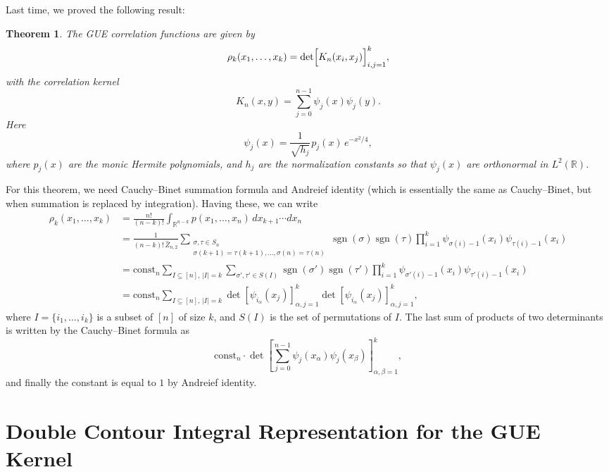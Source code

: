 \documentclass[letterpaper,11pt,oneside,reqno]{book}
\numberwithin{equation}{chapter}  %
\newcommand{\ssp}{\hspace{1pt}}
\newtheorem{theorem}[proposition]{Theorem}
\theoremstyle{definition}
\begin{document}
Last time, we proved the following result:
\begin{theorem}
\label{lecture6:thm:determinantal_GUE}
The GUE correlation functions are given by
\[
\rho_k(x_1,\dots,x_k)=\det\Bigl[K_n(x_i,x_j)\Bigr]_{i,j=1}^k,
\]
with the correlation kernel
\[
K_n(x,y)=\sum_{j=0}^{n-1}\psi_j(x)\psi_j(y).
\]
Here
\begin{equation*}
	\psi_j(x)=\frac{1}{\sqrt{h_j}}\ssp p_j(x)\,e^{-x^2/4},
\end{equation*}
where \(p_j(x)\) are the monic Hermite polynomials, and \(h_j\) are the normalization constants so that
$\psi_j(x)$ are orthonormal in $L^2(\mathbb{R})$.
\end{theorem}

For this theorem, we need Cauchy--Binet summation formula
and Andreief identity (which is essentially the same as Cauchy--Binet, but when summation is
replaced by integration). Having these, we can write
\begin{align*}
	\rho_k(x_1,\dots,x_k)&=\frac{n!}{(n-k)!}\int_{\mathbb{R}^{n-k}} p(x_1,\dots,x_n) \,dx_{k+1}\cdots dx_n
	\\
	&=
	\frac{1}{(n-k)!\,\widehat{Z}_{n,2}}
	\sum_{\substack{\sigma,\tau\in S_n\\
	\sigma(k+1)=\tau(k+1),\ldots,\sigma(n)=\tau(n) }} \operatorname{sgn}(\sigma)\operatorname{sgn}(\tau)
	\prod_{i=1}^k \psi_{\sigma(i)-1}(x_i)\psi_{\tau(i)-1}(x_i)
	\\
	&=
	\mathrm{const}_n\sum_{I\subseteq [n],\,|I|=k}
	\sum_{\sigma',\tau'\in S(I)}
	\operatorname{sgn}(\sigma')\operatorname{sgn}(\tau')
	\prod_{i=1}^k \psi_{\sigma'(i)-1}(x_i)\psi_{\tau'(i)-1}(x_i)
	\\
	&=
	\mathrm{const}_n\sum_{I\subseteq [n],\,|I|=k}
	\det\left[ \psi_{i_\alpha}(x_j) \right]_{\alpha,j=1}^k
	\det\left[ \psi_{i_\alpha}(x_j) \right]_{\alpha,j=1}^k,
\end{align*}
where \(I=\{i_1,\ldots,i_k\}\) is a subset of \([n]\) of size \(k\), and \(S(I)\) is the set of permutations of \(I\).
The last sum of products of two determinants is
written by the Cauchy--Binet formula as
\begin{equation*}
	\mathrm{const}_n\cdot \det\left[ \sum_{j=0}^{n-1}\psi_j(x_\alpha)\psi_j(x_\beta) \right]_{\alpha,\beta=1}^k,
\end{equation*}
and finally the constant is equal to $1$ by Andreief identity.


\section{Double Contour Integral Representation for the GUE Kernel}
\label{lecture6:sec:double-contour}
\end{document}
